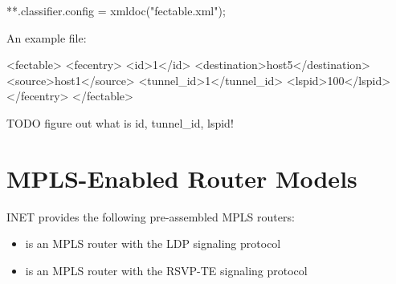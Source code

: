 \begin{inifile}
**.classifier.config = xmldoc("fectable.xml");
\end{inifile}

An example  file:

\begin{XML}
<fectable>
    <fecentry>
        <id>1</id>
        <destination>host5</destination>
        <source>host1</source>
        <tunnel_id>1</tunnel_id>
        <lspid>100</lspid>
    </fecentry>
</fectable>
\end{XML}

TODO figure out what is id, tunnel\_id, lspid!

\section{MPLS-Enabled Router Models}
\label{sec:mpls:mpls-enabled-router-models}

INET provides the following pre-assembled MPLS routers:

\begin{itemize}
  \item {} is an MPLS router with the LDP signaling protocol
  \item {} is an MPLS router with the RSVP-TE signaling protocol
\end{itemize}



